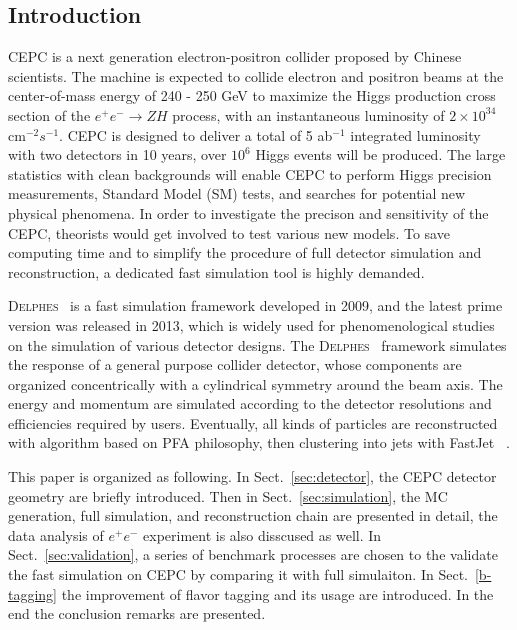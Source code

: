 \documentclass[a4paper,10pt,twoside]{cpc-hepnp}
\begin{document}
\begin{multicols}{2}


\section{Introduction}\label{sec:intro}

CEPC\cite{ref:cepc_det, ref:cepc_acc} is a next generation electron-positron collider proposed by Chinese scientists.
The machine is expected to collide electron and positron beams at the center-of-mass energy of 240 - 250 GeV
to maximize the Higgs production cross section of the $e^+e^- \to ZH$ process, with an instantaneous luminosity of $2\times10^{34}$ cm$^{-2} s^{-1}$.
CEPC is designed to deliver a total of 5 ab$^{-1}$ integrated luminosity with two detectors in 10 years,
over $10^6$ Higgs events will be produced. The large statistics with clean backgrounds will enable CEPC to perform Higgs precision measurements,
Standard Model (SM) tests, and searches for potential new physical phenomena.
In order to investigate the precison and sensitivity of the CEPC, theorists would get involved to test various new models.
To save computing time and to simplify the procedure of full detector simulation and reconstruction,
a dedicated fast simulation tool is highly demanded.

{\textsc{Delphes}~}\cite{ref:delphes} is a fast simulation framework developed in 2009, and the latest prime version was released in 2013,
which is widely used for phenomenological studies on the simulation of various detector designs.
The {\textsc{Delphes}~} framework simulates the response of a general purpose collider detector,
whose components are organized concentrically with a cylindrical symmetry around the beam axis.
The energy and momentum are simulated according to the detector resolutions and efficiencies required by users.
Eventually, all kinds of particles are reconstructed with algorithm based on PFA\cite{ref:pfa} philosophy,
then clustering into jets with FastJet~\cite{ref:fastjet} .

This paper is organized as following.  In Sect.{~\ref{sec:detector}}, the CEPC detector geometry are briefly introduced.
Then in Sect.{~\ref{sec:simulation}}, the MC generation, full simulation, and reconstruction chain are presented in detail,
the data analysis of $e^+e^-$  experiment is also disscused as well.
In Sect.{~\ref{sec:validation}}, a series of benchmark processes are chosen to the validate the fast simulation on CEPC
by comparing it with full simulaiton. In Sect.{~\ref{b-tagging}} the improvement of flavor tagging and its usage are introduced.
In the end the conclusion remarks are presented.


\end{multicols}
\end{document}
